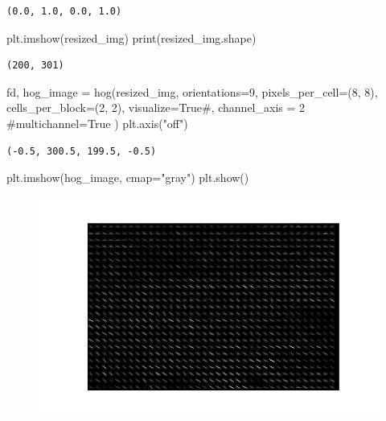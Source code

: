 \documentclass[
  letterpaper,
  DIV=11,
  numbers=noendperiod]{scrreprt}
\newenvironment{Shaded}{\begin{snugshade}}{\end{snugshade}}
\newcommand{\BuiltInTok}[1]{\textcolor[rgb]{0.00,0.23,0.31}{#1}}
\newcommand{\CommentTok}[1]{\textcolor[rgb]{0.37,0.37,0.37}{#1}}
\newcommand{\DecValTok}[1]{\textcolor[rgb]{0.68,0.00,0.00}{#1}}
\newcommand{\NormalTok}[1]{\textcolor[rgb]{0.00,0.23,0.31}{#1}}
\newcommand{\OperatorTok}[1]{\textcolor[rgb]{0.37,0.37,0.37}{#1}}
\newcommand{\StringTok}[1]{\textcolor[rgb]{0.13,0.47,0.30}{#1}}
\newcommand{\VariableTok}[1]{\textcolor[rgb]{0.07,0.07,0.07}{#1}}
\begin{document}
\begin{verbatim}
(0.0, 1.0, 0.0, 1.0)
\end{verbatim}

\begin{Shaded}
\begin{Highlighting}[]
\NormalTok{plt.imshow(resized\_img)}
\BuiltInTok{print}\NormalTok{(resized\_img.shape)}
\end{Highlighting}
\end{Shaded}

\begin{verbatim}
(200, 301)
\end{verbatim}

\begin{Shaded}
\begin{Highlighting}[]
\NormalTok{fd, hog\_image }\OperatorTok{=}\NormalTok{ hog(resized\_img, orientations}\OperatorTok{=}\DecValTok{9}\NormalTok{, pixels\_per\_cell}\OperatorTok{=}\NormalTok{(}\DecValTok{8}\NormalTok{, }\DecValTok{8}\NormalTok{),}
\NormalTok{                    cells\_per\_block}\OperatorTok{=}\NormalTok{(}\DecValTok{2}\NormalTok{, }\DecValTok{2}\NormalTok{), visualize}\OperatorTok{=}\VariableTok{True}\CommentTok{\#, channel\_axis = 2 }
                    \CommentTok{\#multichannel=True}
\NormalTok{                    )}
\NormalTok{plt.axis(}\StringTok{"off"}\NormalTok{)}
\end{Highlighting}
\end{Shaded}

\begin{verbatim}
(-0.5, 300.5, 199.5, -0.5)
\end{verbatim}

\begin{Shaded}
\begin{Highlighting}[]
\NormalTok{plt.imshow(hog\_image, cmap}\OperatorTok{=}\StringTok{"gray"}\NormalTok{)}
\NormalTok{plt.show()}
\end{Highlighting}
\end{Shaded}

\begin{figure}[H]

{\centering \includegraphics{results_files/figure-pdf/unnamed-chunk-30-1.pdf}

}

\end{figure}
\end{document}
